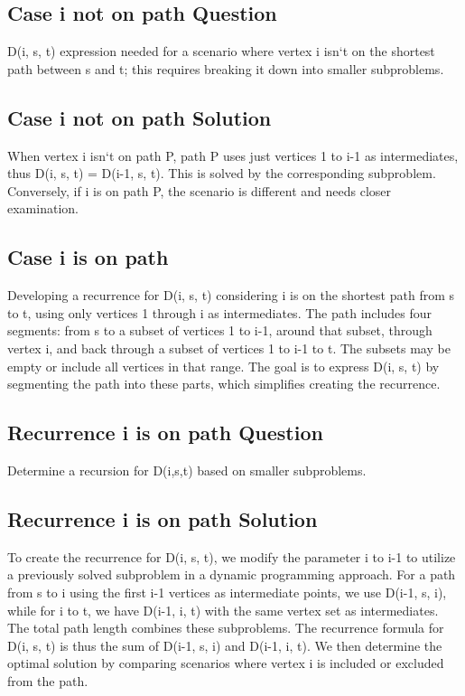 \subsection*{Case  i not on path Question}
D(i, s, t) expression needed for a scenario where vertex i isn`t on the shortest path between s and t; this requires breaking it down into smaller subproblems.

\subsection*{Case  i not on path Solution}
When vertex i isn`t on path P, path P uses just vertices 1 to i-1 as intermediates, thus D(i, s, t) = D(i-1, s, t).
This is solved by the corresponding subproblem.
Conversely, if i is on path P, the scenario is different and needs closer examination.

\subsection*{Case  i is on path}
Developing a recurrence for D(i, s, t) considering i is on the shortest path from s to t, using only vertices 1 through i as intermediates.
The path includes four segments: from s to a subset of vertices 1 to i-1, around that subset, through vertex i, and back through a subset of vertices 1 to i-1 to t.
The subsets may be empty or include all vertices in that range.
The goal is to express D(i, s, t) by segmenting the path into these parts, which simplifies creating the recurrence.

\subsection*{Recurrence  i is on path Question}
Determine a recursion for D(i,s,t) based on smaller subproblems.

\subsection*{Recurrence  i is on path Solution}
To create the recurrence for D(i, s, t), we modify the parameter i to i-1 to utilize a previously solved subproblem in a dynamic programming approach.
For a path from s to i using the first i-1 vertices as intermediate points, we use D(i-1, s, i), while for i to t, we have D(i-1, i, t) with the same vertex set as intermediates.
The total path length combines these subproblems.
The recurrence formula for D(i, s, t) is thus the sum of D(i-1, s, i) and D(i-1, i, t).
We then determine the optimal solution by comparing scenarios where vertex i is included or excluded from the path.

